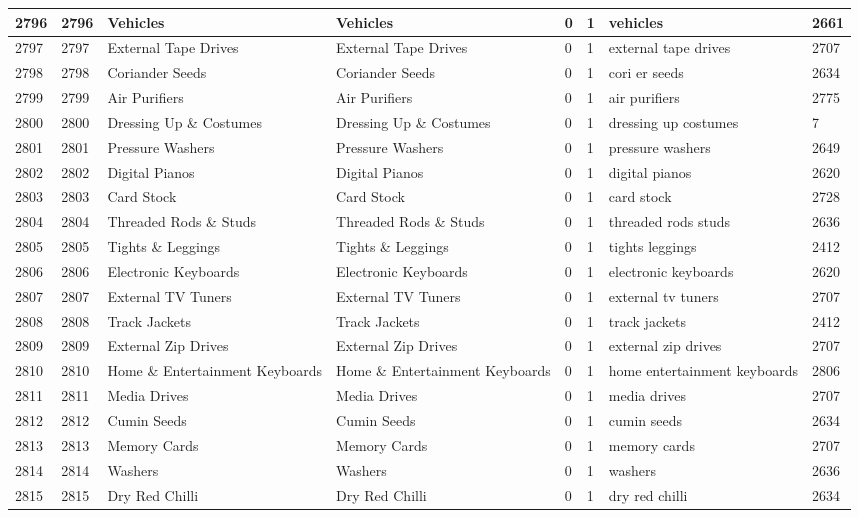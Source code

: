 \begin{longtable}{|l|l|l|l|l|l|l|l|}
2796 & 2796 & Vehicles & Vehicles & 0 & 1 & vehicles & 2661 \\ \hline 
2797 & 2797 & External Tape Drives & External Tape Drives & 0 & 1 & external tape drives & 2707 \\ \hline 
2798 & 2798 & Coriander Seeds & Coriander Seeds & 0 & 1 & cori er seeds & 2634 \\ \hline 
2799 & 2799 & Air Purifiers & Air Purifiers & 0 & 1 & air purifiers & 2775 \\ \hline 
2800 & 2800 & Dressing Up \& Costumes & Dressing Up \& Costumes & 0 & 1 & dressing up costumes & 7 \\ \hline 
2801 & 2801 & Pressure Washers & Pressure Washers & 0 & 1 & pressure washers & 2649 \\ \hline 
2802 & 2802 & Digital Pianos & Digital Pianos & 0 & 1 & digital pianos & 2620 \\ \hline 
2803 & 2803 & Card Stock & Card Stock & 0 & 1 & card stock & 2728 \\ \hline 
2804 & 2804 & Threaded Rods \& Studs & Threaded Rods \& Studs & 0 & 1 & threaded rods studs & 2636 \\ \hline 
2805 & 2805 & Tights \& Leggings & Tights \& Leggings & 0 & 1 & tights leggings & 2412 \\ \hline 
2806 & 2806 & Electronic Keyboards & Electronic Keyboards & 0 & 1 & electronic keyboards & 2620 \\ \hline 
2807 & 2807 & External TV Tuners & External TV Tuners & 0 & 1 & external tv tuners & 2707 \\ \hline 
2808 & 2808 & Track Jackets & Track Jackets & 0 & 1 & track jackets & 2412 \\ \hline 
2809 & 2809 & External Zip Drives & External Zip Drives & 0 & 1 & external zip drives & 2707 \\ \hline 
2810 & 2810 & Home \& Entertainment Keyboards & Home \& Entertainment Keyboards & 0 & 1 & home entertainment keyboards & 2806 \\ \hline 
2811 & 2811 & Media Drives & Media Drives & 0 & 1 & media drives & 2707 \\ \hline 
2812 & 2812 & Cumin Seeds & Cumin Seeds & 0 & 1 & cumin seeds & 2634 \\ \hline 
2813 & 2813 & Memory Cards & Memory Cards & 0 & 1 & memory cards & 2707 \\ \hline 
2814 & 2814 & Washers & Washers & 0 & 1 & washers & 2636 \\ \hline 
2815 & 2815 & Dry Red Chilli & Dry Red Chilli & 0 & 1 & dry red chilli & 2634 \\ \hline 

\end{longtable}
